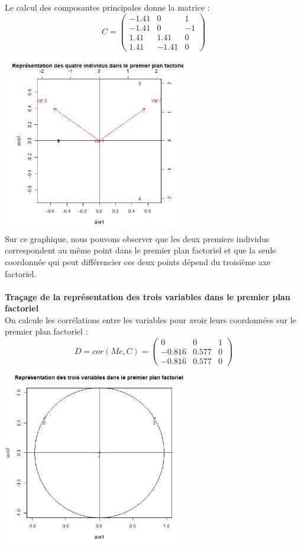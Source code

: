 ﻿\documentclass[a4paper, 9pt]{article}
\begin{document}
Le calcul des composantes principales donne la matrice :\\
\[C =
\begin{pmatrix}
-1.41 & 0 & 1\\
-1.41 & 0 & -1\\
1.41 & 1.41 & 0\\
1.41 & -1.41 & 0
\end{pmatrix}\]
\includegraphics[height = 8cm, width = 8cm]{plots/plot_composantes_principales.png}\\
Sur ce graphique, nous pouvons observer que les deux premiers individus correspondent au m\^eme point dans le premier plan factoriel
et que la seule coordonn\'ee qui peut diff\'erencier ces deux points d\'epend du troisi\`eme axe factoriel.\\ \\
\textbf{Traçage de la repr\'esentation des trois variables dans le premier plan factoriel}\\
On calcule les corr\'elations entre les variables pour avoir leurs coordonn\'ees sur le premier plan factoriel :\\
\[D = cor(Mc, C) =
\begin{pmatrix}
0 & 0 & 1\\
-0.816 & 0.577 & 0\\
-0.816 & 0.577 & 0
\end{pmatrix}\]
\includegraphics[height = 8cm, width = 8cm]{plots/plot_correlation.png}\\
\end{document}
